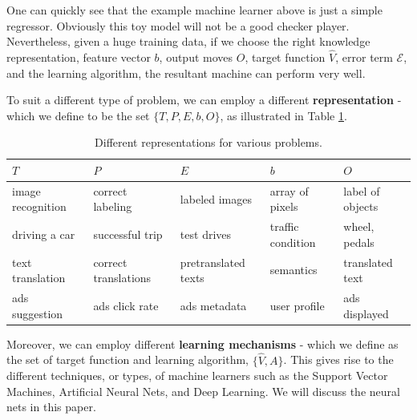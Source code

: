 \documentclass[12pt]{article}  %
\begin{document}
One can quickly see that the example machine learner above is just a simple regressor. Obviously this toy model will not be a good checker player. Nevertheless, given a huge training data, if we choose the right knowledge representation, feature vector $b$, output moves $O$, target function $\hat{V}$, error term $\mathcal{E}$, and the learning algorithm, the resultant machine can perform very well. 

To suit a different type of problem, we can employ a different {\bf representation} - which we define to be the set $\{T, P, E, b, O\}$, as illustrated in Table \ref{rep}.



\begin{table}[ht]
\begin{center}
\begin{tabular}{ | l | l | l || l | l | }

\hline
$T$ & $P$ & $E$ & $b$ & $O$ \\
\hline \hline
image recognition & correct labeling & labeled images & array of pixels & label of objects \\
\hline
driving a car & successful trip & test drives & traffic condition & wheel, pedals  \\
\hline
text translation & correct translations & pretranslated texts & semantics & translated text \\
\hline
ads suggestion & ads click rate & ads metadata & user profile & ads displayed \\
\hline
\end{tabular}
\caption{Different representations for various problems.}
\label{rep}
\end{center}
\end{table}



Moreover, we can employ different {\bf learning mechanisms} - which we define as the set of target function and learning algorithm, $\{\hat{V}, A\}$. This gives rise to the different techniques, or types, of machine learners such as the Support Vector Machines, Artificial Neural Nets, and Deep Learning. We will discuss the neural nets in this paper.
\end{document}
